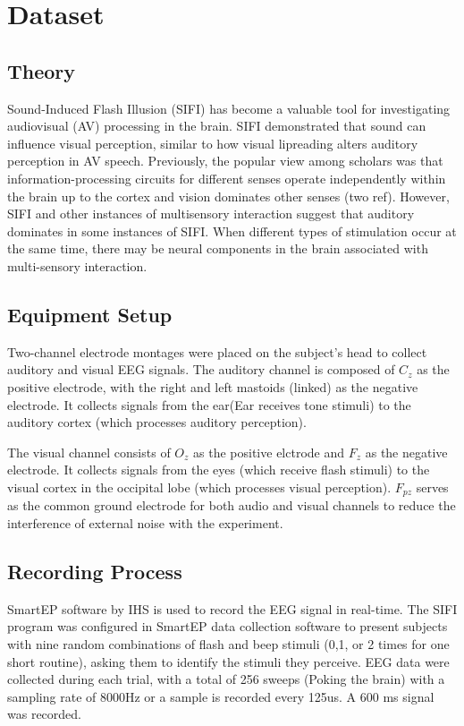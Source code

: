 \documentclass{article}
\begin{document}
	
	\section{Dataset}
	\subsection{Theory}
	Sound-Induced Flash Illusion (SIFI) has become a valuable tool for investigating audiovisual (AV) processing in the brain. SIFI demonstrated that sound can influence visual perception, similar to how visual lipreading alters auditory perception in AV speech. Previously, the popular view among scholars was that information-processing circuits for different senses operate independently within the brain up to the cortex and vision dominates other senses (two ref). However, SIFI and other instances of multisensory interaction suggest that auditory dominates in some instances of SIFI. When different types of stimulation occur at the same time, there may be neural components in the brain associated with multi-sensory interaction.
	
	\subsection{Equipment Setup}
	Two-channel electrode montages were placed on the subject's head to collect auditory and visual EEG signals. The auditory channel is composed of $C_z$ as the positive electrode, with the right and left mastoids (linked) as the negative electrode. It collects signals from the ear(Ear receives tone stimuli) to the auditory cortex (which processes auditory perception).
	
	The visual channel consists of $O_z$ as the positive elctrode and $F_z$ as the negative electrode. It collects signals from the eyes (which receive flash stimuli) to the visual cortex in the occipital lobe (which processes visual perception). $F_{pz}$ serves as the common ground electrode for both audio and visual channels to reduce the interference of external noise with the experiment.
	
	\subsection{Recording Process}
	SmartEP software by IHS is used to record the EEG signal in real-time. The SIFI program was configured in SmartEP data collection software to present subjects with nine random combinations of flash and beep stimuli (0,1, or 2 times for one short routine), asking them to identify the stimuli they perceive. EEG data were collected during each trial, with a total of 256 sweeps (Poking the brain) with a sampling rate of 8000Hz or a sample is recorded every 125us. A 600 ms signal was recorded.
	
\end{document}
